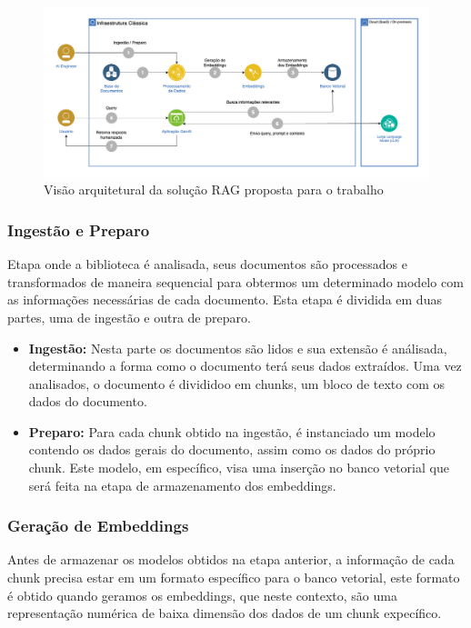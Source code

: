 \documentclass[a4paper, 12pt]{article}
\begin{document}
    \begin{figure}[h]
        \label{fig:arquitetura_solucao}
        \includegraphics[width=\textwidth,height=0.9\textheight,keepaspectratio]{architecture.png}
        \centering
        \caption{Visão arquitetural da solução RAG proposta para o trabalho}
        \centering
    \end{figure}

    \subsubsection{Ingestão e Preparo}
    
    Etapa onde a biblioteca é analisada, seus documentos são processados e transformados de maneira sequencial para obtermos um determinado modelo com as informações necessárias de cada documento. Esta etapa é dividida em duas partes, uma de ingestão e outra de preparo.

    \begin{itemize}
        \item \textbf{Ingestão:} Nesta parte os documentos são lidos e sua extensão é análisada, determinando a forma como o documento terá seus dados extraídos. Uma vez analisados, o documento é divididoo em chunks, um bloco de texto com os dados do documento.
        \item \textbf{Preparo:} Para cada chunk obtido na ingestão, é instanciado um modelo contendo os dados gerais do documento, assim como os dados do próprio chunk. Este modelo, em específico, visa uma inserção no banco vetorial que será feita na etapa de armazenamento dos embeddings.
    \end{itemize}

    \subsubsection{Geração de Embeddings}
    
    Antes de armazenar os modelos obtidos na etapa anterior, a informação de cada chunk precisa estar em um formato específico para o banco vetorial, este formato é obtido quando geramos os embeddings, que neste contexto, são uma representação numérica de baixa dimensão dos dados de um chunk expecífico.
\end{document}
